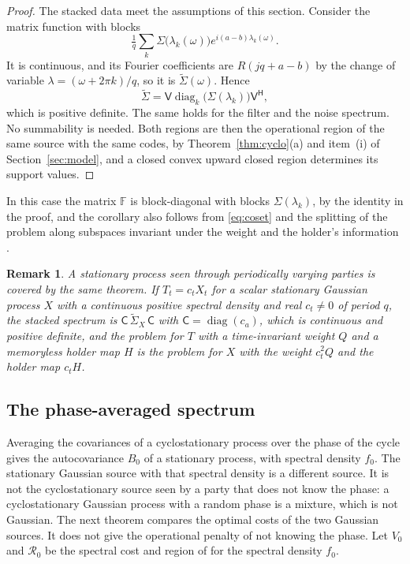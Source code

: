 \documentclass[11pt,onecolumn]{IEEEtran}
\newtheorem{remark}[theorem]{Remark}
\newcommand{\herm}{\mathsf H}
\newcommand{\tS}{\tilde\Sigma}
\newcommand{\cF}{\mathbb F}
\begin{document}
\begin{proof}
The stacked data meet the assumptions of this section. Consider the matrix function with blocks
\[
\tfrac1q\sum_k\Sigma\bigl(\lambda_k(\omega)\bigr)e^{i(a-b)\lambda_k(\omega)} .
\]
It is continuous, and its Fourier coefficients are $R(jq+a-b)$ by the
change of variable $\lambda=(\omega+2\pi k)/q$, so it is $\tS(\omega)$.
Hence
\[
\tS=\mathsf V\operatorname{diag}_k\bigl(\Sigma(\lambda_k)\bigr)\mathsf V^{\herm},
\]
which is positive definite. The same holds for the filter and the noise
spectrum. No summability is needed. Both regions are then the
operational region of the same source with the same codes, by
Theorem~\ref{thm:cyclo}(a) and item~(i) of Section~\ref{sec:model}, and a
closed convex upward closed region determines its support values.
\end{proof}

In this case the matrix $\cF$ is block-diagonal with blocks
$\Sigma(\lambda_k)$, by the identity in the proof, and the corollary
also follows from \eqref{eq:coset} and the splitting of the problem
along subspaces invariant under the weight and the holder's
information \cite[Theorem~12]{part1}.

\begin{remark}
A stationary process seen through periodically varying parties is
covered by the same theorem. If $T_t=c_tX_t$ for a scalar stationary
Gaussian process $X$ with a continuous positive spectral density and
real $c_t\ne0$ of period $q$, the stacked spectrum is
$\mathsf C\,\tS_X\,\mathsf C$ with $\mathsf C=\operatorname{diag}(c_a)$,
which is continuous and positive definite, and the problem for $T$
with a time-invariant weight $Q$ and a memoryless holder map $H$ is the
problem for $X$ with the weight $c_t^2Q$ and the holder map $c_tH$.
\end{remark}

\subsection{The phase-averaged spectrum}

Averaging the covariances of a cyclostationary process over the phase
of the cycle gives the autocovariance $B_0$ of a stationary process,
with spectral density $f_0$. The stationary Gaussian source with that
spectral density is a different source. It is not the cyclostationary
source seen by a party that does not know the phase: a cyclostationary
Gaussian process with a random phase is a mixture, which is not
Gaussian. The next theorem compares the optimal costs of the two
Gaussian sources. It does not give the operational penalty of not
knowing the phase. Let
$V_0$ and $\mathcal R_0$ be the spectral cost and region of
\cite{part2} for the spectral density $f_0$.
\end{document}
